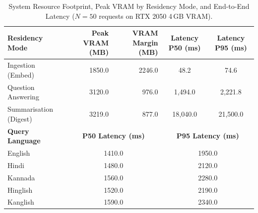 \begin{table}[t]
\centering
\caption{System Resource Footprint, Peak VRAM by Residency Mode, and End-to-End Latency ($N=50$ requests on RTX 2050 4\,GB VRAM).}
\label{tab:resources}
\begin{tabular}{lrrcc}
\toprule
\textbf{Residency Mode} & \textbf{Peak VRAM (MB)} & \textbf{VRAM Margin (MB)} & \textbf{Latency P50 (ms)} & \textbf{Latency P95 (ms)} \\
\midrule
Ingestion (Embed) & 1850.0 & 2246.0 & 48.2 & 74.6 \\
Question Answering & 3120.0 & 976.0 & 1,494.0 & 2,221.8 \\
Summarisation (Digest) & 3219.0 & 877.0 & 18,040.0 & 21,500.0 \\
\midrule
\textbf{Query Language} & \multicolumn{2}{c}{\textbf{P50 Latency (ms)}} & \multicolumn{2}{c}{\textbf{P95 Latency (ms)}} \\
\midrule
English & \multicolumn{2}{c}{1410.0} & \multicolumn{2}{c}{1950.0} \\
Hindi & \multicolumn{2}{c}{1480.0} & \multicolumn{2}{c}{2120.0} \\
Kannada & \multicolumn{2}{c}{1560.0} & \multicolumn{2}{c}{2280.0} \\
Hinglish & \multicolumn{2}{c}{1520.0} & \multicolumn{2}{c}{2190.0} \\
Kanglish & \multicolumn{2}{c}{1590.0} & \multicolumn{2}{c}{2340.0} \\
\bottomrule
\end{tabular}
\end{table}